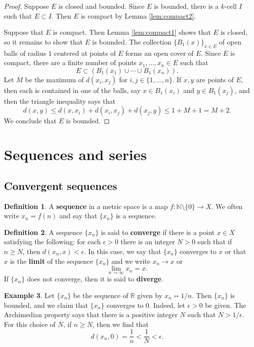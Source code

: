 \documentclass[12pt]{article}
\theoremstyle{definition}
\newtheorem{definition}{Definition}
\newtheorem{example}[definition]{Example}
\theoremstyle{theorem}
\begin{document}
\begin{proof}
Suppose $E$ is closed and bounded. Since $E$ is bounded, there is a $k$-cell $I$ such that $E \subset I$. Then $E$ is compact by Lemma \ref{lem:compact2}. 

Suppose that $E$ is compact. Then Lemma \ref{lem:compact1} shows that $E$ is closed, so it remains to show that $E$ is bounded. The collection $\{B_1(x)\}_{x \in E}$ of open balls of radius $1$ centered at points of $E$ forms an open cover of $E$. Since $E$ is compact, there are a finite number of points $x_1, \ldots, x_n \in E$ such that 
\[
E \subset (B_1(x_1) \cup \cdots \cup B_1(x_n)).
\] 
Let $M$ be the maximum of $d(x_i, x_j)$ for $i, j \in \{1, \ldots, n\}$. If $x,y$ are points of $E$, then each is contained in one of the balls, say $x \in B_1(x_i)$ and $y \in B_1(x_j)$, and then the triangle inequality says that 
\[
d(x,y) \leqslant d(x,x_i) + d(x_i, x_j) + d(x_j, y) \leqslant 1 + M + 1 = M +2.
\]
We conclude that $E$ is bounded. 
\end{proof}



\section{Sequences and series}



\subsection{Convergent sequences}

\begin{definition}
A \textbf{sequence} in a metric space is a map $f : \mathbb{N} \setminus \{0\} \to X$. We often write $x_n = f(n)$ and say that $\{x_n\}$ is a sequence. 
\end{definition}

\begin{definition}
A sequence $\{x_n\}$ is said to \textbf{converge} if there is a point $x \in X$ satisfying the following: for each $\epsilon > 0$ there is an integer $N > 0$ such that if $n \geqslant N$, then $d(x_n,x) < \epsilon$. In this case, we say that $\{x_n\}$ converges to $x$ or that $x$ is the \textbf{limit} of the sequence $\{x_n\}$ and we write $x_n \to x$ or 
\[
\lim_{n \to \infty}x_n = x.
\]
If $\{x_n\}$ does not converge, then it is said to \textbf{diverge}. 
\end{definition}

\begin{example}
Let $\{x_n\}$ be the sequence of $\mathbb{R}$ given by $x_n = 1/n$. Then $\{x_n\}$ is bounded, and we claim that $\{x_n\}$ converges to 0. Indeed, let $\epsilon > 0$ be given. The Archimedian property says that there is a positive integer $N$ such that $N > 1/\epsilon$. For this choice of $N$, if $n \geqslant N$, then we find that 
\[
d(x_n, 0) = \frac{1}{n} < \frac{1}{N} < \epsilon. 
\]
\end{example}
\end{document}
